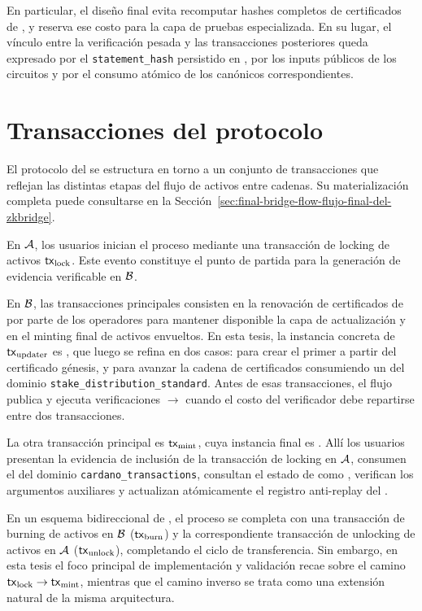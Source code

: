 En particular, el diseño final evita recomputar \Onchain hashes completos de certificados de \Mithril, y reserva ese costo para la capa de pruebas especializada.
En su lugar, el vínculo entre la verificación pesada y las transacciones posteriores queda expresado por el \texttt{statement\_hash} persistido en \ProofReceipt, por los inputs públicos de los circuitos \Groth y por el consumo atómico de los \UTxOs canónicos correspondientes.

\section{Transacciones del protocolo}
\label{sec:design-decisions-transacciones-del-protocolo}

El protocolo del \Bridge se estructura en torno a un conjunto de transacciones que reflejan las distintas etapas del flujo de activos entre cadenas. Su materialización completa puede consultarse en la Sección~\ref{sec:final-bridge-flow-flujo-final-del-zkbridge}.

En $\mathcal{A}$, los usuarios inician el proceso mediante una transacción de locking de activos $\mathsf{tx}_{\mathrm{lock}}$. Este evento constituye el punto de partida para la generación de evidencia verificable en $\mathcal{B}$.

En $\mathcal{B}$, las transacciones principales consisten en la renovación de certificados de \Mithril por parte de los operadores para mantener disponible la capa de actualización y en el minting final de activos envueltos. En esta tesis, la instancia concreta de $\mathsf{tx}_{\mathrm{updater}}$ es \StakeDistTx, que luego se refina en dos casos: \StakeDistributionGenesisTxTemplate para crear el primer \StakeDistributionUTxO a partir del certificado génesis, y \StakeDistributionStandardTxTemplate para avanzar la cadena de certificados consumiendo un \ProofReceipt del dominio \texttt{stake\_distribution\_standard}. Antes de esas transacciones, el flujo publica \ReferenceScripts y ejecuta verificaciones \PhaseOneSetupTx $\rightarrow$ \PhaseTwoVerifyTx cuando el costo del verificador \STM debe repartirse entre dos transacciones.

La otra transacción principal es $\mathsf{tx}_{\mathrm{mint}}$, cuya instancia final es \BridgeMintTxTemplate. Allí los usuarios presentan la evidencia de inclusión de la transacción de locking en $\mathcal{A}$, consumen el \ProofReceipt del dominio \texttt{cardano\_transactions}, consultan el estado de \StakeDistribution como \ReferenceInput, verifican los argumentos \Groth auxiliares y actualizan atómicamente el registro anti-replay del \Bridge.

En un esquema bidireccional de \Bridge, el proceso se completa con una transacción de burning de activos en $\mathcal{B}$ ($\mathsf{tx}_{\mathrm{burn}}$) y la correspondiente transacción de unlocking de activos en $\mathcal{A}$ ($\mathsf{tx}_{\mathrm{unlock}}$), completando el ciclo de transferencia. Sin embargo, en esta tesis el foco principal de implementación y validación recae sobre el camino $\mathsf{tx}_{\mathrm{lock}} \rightarrow \mathsf{tx}_{\mathrm{mint}}$, mientras que el camino inverso se trata como una extensión natural de la misma arquitectura.
